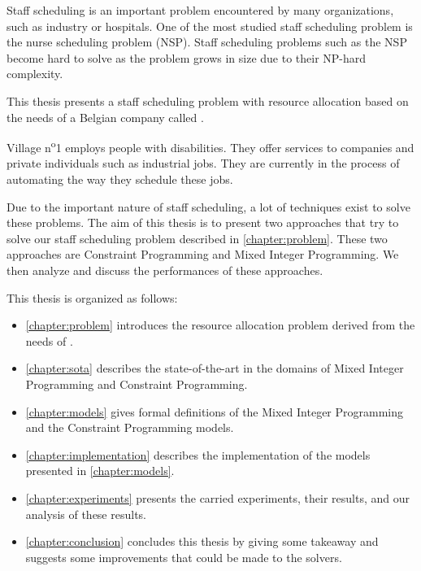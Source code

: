 \documentclass[../thesis.tex]{subfiles}
\begin{document}
Staff scheduling is an important problem encountered by many organizations, such as industry or hospitals.
One of the most studied staff scheduling problem is the nurse scheduling problem (NSP). 
Staff scheduling problems such as the NSP become hard to solve as the problem grows in size due to their NP-hard complexity.

This thesis presents a staff scheduling problem with resource allocation based on the needs of a Belgian company called \vone.

Village n\textsuperscript{o}1 employs people with disabilities.
They offer services to companies and private individuals such as industrial jobs. They
are currently in the process of automating the way they schedule these jobs. 

Due to the important nature of staff scheduling, a lot of techniques exist to solve these problems. 
The aim of this thesis is to present two approaches that try to solve our staff scheduling problem described 
in \autoref{chapter:problem}. These two approaches are Constraint Programming and Mixed Integer Programming.
We then analyze and discuss the performances of these approaches.



This thesis is organized as follows:

\begin{itemize}
  \item[] \autoref{chapter:problem} introduces the resource allocation problem derived from the needs of \vone.
  \item[] \autoref{chapter:sota} describes the state-of-the-art in the domains of Mixed Integer Programming and Constraint Programming. 
  \item[] \autoref{chapter:models} gives formal definitions of the Mixed Integer Programming and the Constraint Programming models.
  \item[] \autoref{chapter:implementation} describes the implementation of the models presented in \autoref{chapter:models}.
  \item[] \autoref{chapter:experiments} presents the carried experiments, their results, and our analysis of these results.
  \item[] \autoref{chapter:conclusion} concludes this thesis by giving some takeaway and suggests some improvements that could be made to the solvers.
\end{itemize}
\end{document}

